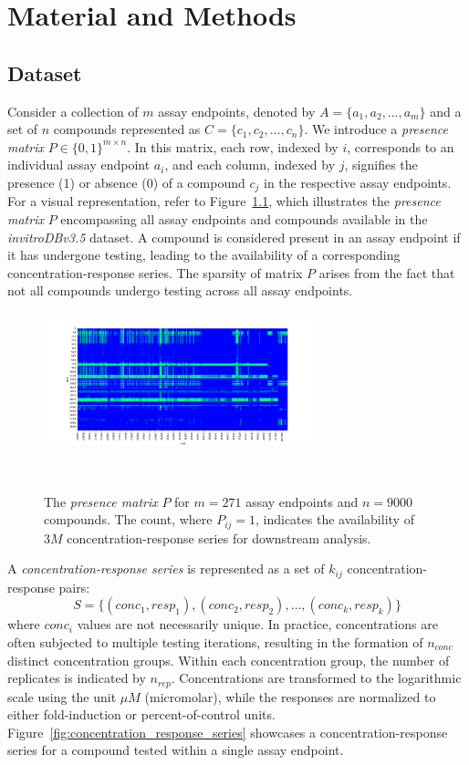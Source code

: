 \chapter{Material and Methods}
\section{Dataset}
Consider a collection of $m$ assay endpoints, denoted by $A = \{a_1, a_2, \dots, a_m\}$ and a set of $n$ compounds represented as $C = \{c_1, c_2, \dots, c_n\}$.
We introduce a \emph{presence matrix} $P \in {\{0, 1\}}^{m \times n}$. In this matrix, each row, indexed by $i$, corresponds to an individual assay endpoint $a_i$, and each column, indexed by $j$, signifies the presence (1) or absence (0) of a compound $c_j$ in the respective assay endpoints.
For a visual representation, refer to Figure~\ref{fig:presence_matrix_aeid_chid}, which illustrates the \emph{presence matrix} $P$ encompassing all assay endpoints and compounds available in the \textit{invitroDBv3.5} dataset. A compound is considered present in an assay endpoint if it has undergone testing, leading to the availability of a corresponding concentration-response series. The sparsity of matrix $P$ arises from the fact that not all compounds undergo testing across all assay endpoints.

\begin{figure}[h]  %
    \centering
    \includegraphics[width=0.7\textwidth]{figures/presence_matrix_aeid_chid.png}  
    \caption{The \emph{presence matrix} $P$ for $m = 271$ assay endpoints and $n = 9000$ compounds. The count, where $P_{ij} = 1$, indicates the availability of $3M$ concentration-response series for downstream analysis.}
~\label{fig:presence_matrix_aeid_chid} 
\end{figure}


A \textit{concentration-response series} is represented as a set of $k_{ij}$ concentration-response pairs: 
\[ S = \{(conc_1, resp_1), (conc_2, resp_2), \dots, (conc_k, resp_k)\} \]
where $conc_i$ values are not necessarily unique. 
In practice, concentrations are often subjected to multiple testing iterations, resulting in the formation of $n_{conc}$ distinct concentration groups. Within each concentration group, the number of replicates is indicated by $n_{rep}$.
Concentrations are transformed to the logarithmic scale using the unit $\mu M$ (micromolar), while the responses are normalized to either fold-induction or percent-of-control units.
Figure~\ref{fig:concentration_response_series} showcases a concentration-response series for a compound tested within a single assay endpoint.

